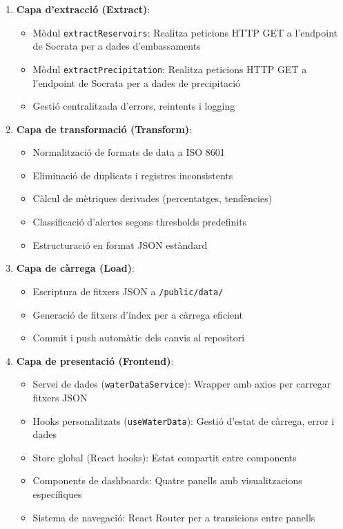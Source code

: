 \begin{enumerate}
    \item \textbf{Capa d'extracció (Extract)}:
    \begin{itemize}
        \item Mòdul \texttt{extractReservoirs}: Realitza peticions HTTP GET a l'endpoint de Socrata per a dades d'embassaments
        \item Mòdul \texttt{extractPrecipitation}: Realitza peticions HTTP GET a l'endpoint de Socrata per a dades de precipitació
        \item Gestió centralitzada d'errors, reintents i logging
    \end{itemize}
    
    \item \textbf{Capa de transformació (Transform)}:
    \begin{itemize}
        \item Normalització de formats de data a ISO 8601
        \item Eliminació de duplicats i registres inconsistents
        \item Càlcul de mètriques derivades (percentatges, tendències)
        \item Classificació d'alertes segons thresholds predefinits
        \item Estructuració en format JSON estàndard
    \end{itemize}
    
    \item \textbf{Capa de càrrega (Load)}:
    \begin{itemize}
        \item Escriptura de fitxers JSON a \texttt{/public/data/}
        \item Generació de fitxers d'índex per a càrrega eficient
        \item Commit i push automàtic dels canvis al repositori
    \end{itemize}
    
    \item \textbf{Capa de presentació (Frontend)}:
    \begin{itemize}
        \item Servei de dades (\texttt{waterDataService}): Wrapper amb axios per carregar fitxers JSON
        \item Hooks personalitzats (\texttt{useWaterData}): Gestió d'estat de càrrega, error i dades
        \item Store global (React hooks): Estat compartit entre components
        \item Components de dashboards: Quatre panells amb visualitzacions específiques
        \item Sistema de navegació: React Router per a transicions entre panells
    \end{itemize}
\end{enumerate}

